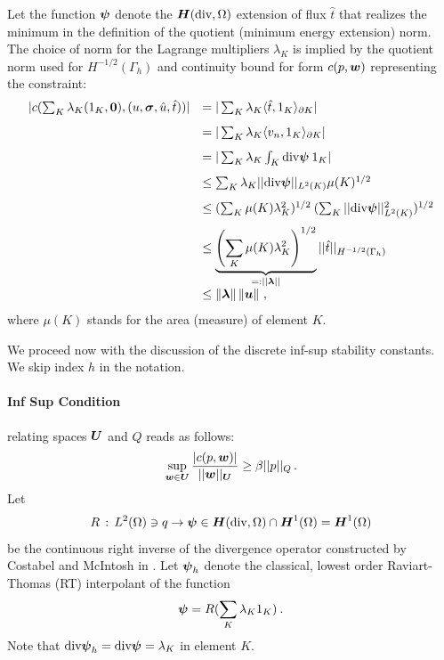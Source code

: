 \documentclass[Proposal.tex]{subfiles}
\begin{document}
Let the function $\boldsymbol\psi$ denote the $\mbox{\boldmath $H$}(\text{div},\Omega)$ extension of flux $\hat{t}$
that realizes the minimum in the definition of the quotient (minimum energy
extension) norm.
The choice of norm for the Lagrange multipliers $\lambda_K$ is implied
by the quotient norm used for $H^{-1/2}(\Gamma_h)$ and continuity
bound for form $c(p,\boldsymbol w)$ representing the constraint:
\begin{equation}
\begin{array}{lll}
| c(\sum_K \lambda_K (1_K,{\bf 0}),(u,\boldsymbol\sigma,\hat{u},\hat{t})) |
& = | \sum_K \lambda_K \langle \hat{t}, 1_K \rangle_{\partial K} | \\[8pt]
& = | \sum_K \lambda_K \langle v_n , 1_K \rangle_{\partial K} | \\[8pt]
& = | \sum_K \lambda_K \int_K \text{div} \boldsymbol\psi \: 1_K  | \\[8pt]
& \leq \sum_K  \lambda_K || \text{div} \boldsymbol\psi ||_{L^2(K)} \mu(K)^{1/2} \\[8pt]
& \leq (\sum_K \mu(K) \lambda_K^2)^{1/2} \: (\sum_K || \text{div} \boldsymbol\psi ||_{L^2(K)}^2 )^{1/2} \\[8pt]
& \leq \underbrace{\left(\sum_K \mu(K) \lambda_K^2\right)^{1/2}}_{=: || \boldsymbol\lambda ||} ||
\hat{t} ||_{H^{-1/2}(\Gamma_h)}\\[8pt]
& \leq \left\| \boldsymbol\lambda \right\|\left\| \boldsymbol u \right\|
\,,
\end{array}
\end{equation}
where $\mu(K)$ stands for the area (measure) of element $K$.

We proceed now with the discussion of the discrete inf-sup stability constants. We skip
index $h$ in the notation.

\paragraph{Inf Sup Condition} relating spaces $\boldsymbol U$ and $Q$ reads as follows:
\begin{equation}
   \sup_{\boldsymbol w \in \boldsymbol U} \frac{| c(p,\boldsymbol w) |}{|| \boldsymbol w ||_{\boldsymbol U}} \geq \beta ||
   p ||_Q\,.
\end{equation}
Let
\begin{equation}
R\, : \, L^2(\Omega) \ni q \to \boldsymbol\psi \in \mbox{\boldmath $H$}(\text{div},\Omega) \cap \mbox{\boldmath $H$}^1(\Omega)
=\mbox{\boldmath $H$}^1(\Omega)
\end{equation}
be
the continuous right inverse of the divergence operator constructed by
Costabel and McIntosh in \cite{CostabelMcIntosh}.
Let $\boldsymbol\psi_h$ denote the classical, lowest order Raviart-Thomas (RT) interpolant of
the function
\begin{equation}
\boldsymbol\psi = R (\sum_K \lambda_K 1_K) \: .
\end{equation}
Note that $\text{div} \boldsymbol\psi_h = \text{div} \boldsymbol\psi = \lambda_K$ in element $K$.
\end{document}
